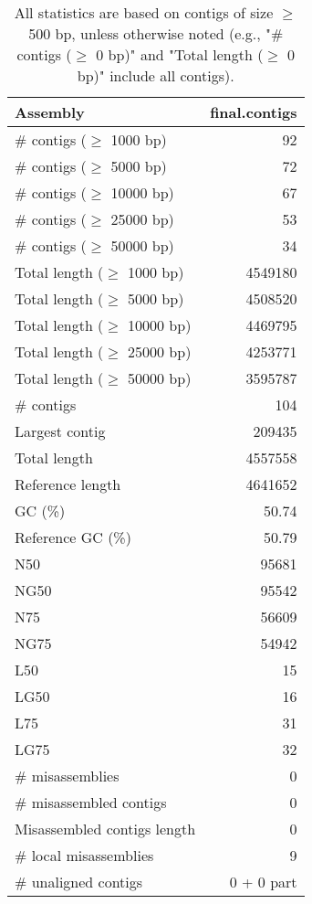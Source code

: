 \documentclass[12pt,a4paper]{article}
\begin{document}
\begin{table}[ht]
\begin{center}
\caption{All statistics are based on contigs of size $\geq$ 500 bp, unless otherwise noted (e.g., "\# contigs ($\geq$ 0 bp)" and "Total length ($\geq$ 0 bp)" include all contigs).}
\begin{tabular}{|l*{1}{|r}|}
\hline
Assembly & final.contigs \\ \hline
\# contigs ($\geq$ 1000 bp) & 92 \\ \hline
\# contigs ($\geq$ 5000 bp) & 72 \\ \hline
\# contigs ($\geq$ 10000 bp) & 67 \\ \hline
\# contigs ($\geq$ 25000 bp) & 53 \\ \hline
\# contigs ($\geq$ 50000 bp) & 34 \\ \hline
Total length ($\geq$ 1000 bp) & 4549180 \\ \hline
Total length ($\geq$ 5000 bp) & 4508520 \\ \hline
Total length ($\geq$ 10000 bp) & 4469795 \\ \hline
Total length ($\geq$ 25000 bp) & 4253771 \\ \hline
Total length ($\geq$ 50000 bp) & 3595787 \\ \hline
\# contigs & 104 \\ \hline
Largest contig & 209435 \\ \hline
Total length & 4557558 \\ \hline
Reference length & 4641652 \\ \hline
GC (\%) & 50.74 \\ \hline
Reference GC (\%) & 50.79 \\ \hline
N50 & 95681 \\ \hline
NG50 & 95542 \\ \hline
N75 & 56609 \\ \hline
NG75 & 54942 \\ \hline
L50 & 15 \\ \hline
LG50 & 16 \\ \hline
L75 & 31 \\ \hline
LG75 & 32 \\ \hline
\# misassemblies & 0 \\ \hline
\# misassembled contigs & 0 \\ \hline
Misassembled contigs length & 0 \\ \hline
\# local misassemblies & 9 \\ \hline
\# unaligned contigs & 0 + 0 part \\ \hline

\end{tabular}
\end{center}
\end{table}
\end{document}
